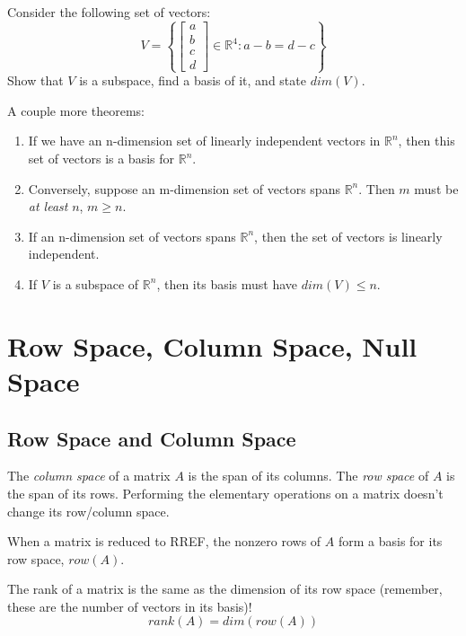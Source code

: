 \documentclass[11pt]{exam}
\begin{document}
    \begin{questions}
        \item Consider the following set of vectors:
        $$ V = \left\{ \begin{bmatrix} a \\ b \\ c \\ d \end{bmatrix} \in \mathbb{R}^4 : a - b = d - c \right\} $$
        Show that $V$ is a subspace, find a basis of it, and state $dim(V)$.
    \end{questions}

    A couple more theorems:
    \begin{enumerate}
        \item If we have an n-dimension set of linearly independent vectors in $\mathbb{R}^n$, then this set of vectors is a basis for $\mathbb{R}^n$.
        \item Conversely, suppose an m-dimension set of vectors spans $\mathbb{R}^n$. Then $m$ must be \textit{at least} $n$, $m \geq n$.
        \item If an n-dimension set of vectors spans $\mathbb{R}^n$, then the set of vectors is linearly independent.
        \item If $V$ is a subspace of $\mathbb{R}^n$, then its basis must have $dim(V) \leq n$.
    \end{enumerate}

\vspace{40px}
\section{Row Space, Column Space, Null Space}
    
    \vspace{20px}
    \subsection{Row Space and Column Space}
    The \textit{column space} of a matrix $A$ is the span of its columns. The \textit{row space} of $A$ is the span of its rows.
    Performing the elementary operations on a matrix doesn't change its row/column space.

    When a matrix is reduced to RREF, the nonzero rows of $A$ form a basis for its row space, $row(A)$.

    The rank of a matrix is the same as the dimension of its row space (remember, these are the number of vectors in its basis)!
    $$rank(A) = dim(row(A))$$
\end{document}
